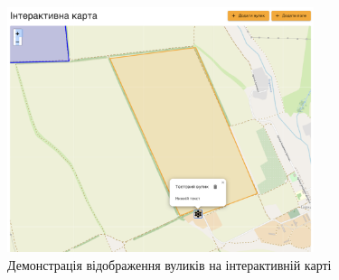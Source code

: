 \begin{figure}[htbp]
    \centering
    \includegraphics[width=0.8\textwidth]{practice_report/images/map_hives_demo.png}
    \caption{Демонстрація відображення вуликів на інтерактивній карті}
    \label{fig:map_hives_demo}
\end{figure}

